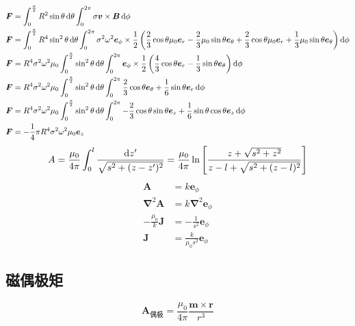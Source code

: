 \begin{align*}
    \boldsymbol{F}&=\int_{0}^{\frac{\pi}{2}}R^2\sin\theta\dif\theta\int_{0}^{2\pi}\sigma \boldsymbol{v}\times\boldsymbol{B}\dif\phi\\
    \boldsymbol{F}&=\int_{0}^{\frac{\pi}{2}}R^4\sin^2\theta\dif\theta\int_{0}^{2\pi}\sigma^2 \omega^2 \boldsymbol{e}_\phi\times\frac12\left(\frac{2}{3}
\cos\theta  \mu_0  \boldsymbol{e}_r
-\frac{2}{3 } \mu_0 \sin\theta 
\boldsymbol{e}_\theta
+\frac{2}{3}
\cos\theta  \mu_0 \boldsymbol{e}_r
+\frac{1}{3 } \mu_0 \sin\theta 
\boldsymbol{e}_\theta\right)\dif\phi\\
\boldsymbol{F}&=R^4\sigma^2 \omega^2\mu_0\int_{0}^{\frac{\pi}{2}}\sin^2\theta\dif\theta\int_{0}^{2\pi} \boldsymbol{e}_\phi\times\frac12\left(\frac{4}{3}
\cos\theta    \boldsymbol{e}_r
-\frac{1}{3 } \sin\theta 
\boldsymbol{e}_\theta\right)\dif\phi\\
\boldsymbol{F}&=R^4\sigma^2 \omega^2\mu_0\int_{0}^{\frac{\pi}{2}}\sin^2\theta\dif\theta\int_{0}^{2\pi} \frac{2}{3}
\cos\theta    \boldsymbol{e}_\theta
+\frac{1}{6} \sin\theta 
\boldsymbol{e}_r\dif\phi\\
\boldsymbol{F}&=R^4\sigma^2 \omega^2\mu_0\int_{0}^{\frac{\pi}{2}}\sin^2\theta\dif\theta\int_{0}^{2\pi} -\frac{2}{3}
\cos\theta    \sin\theta\boldsymbol{e}_z
+\frac{1}{6} \sin\theta \cos\theta
\boldsymbol{e}_z\dif\phi\\
\boldsymbol{F}&=-\frac{1}{4}\pi R^4\sigma^2 \omega^2\mu_0
\boldsymbol{e}_z
\end{align*}
\begin{align*}
    A=\frac{\mu_0}{4\pi}\int_0^l\frac{\dif z'}{\sqrt{s^2+(z-z')^2}}=\frac{\mu_0}{4\pi}\ln\left[\frac{z+\sqrt{s^2+z^2}}{z-l+\sqrt{s^2+(z-l)^2}}\right]\end{align*}
\begin{align*}
    \boldsymbol A&=k\boldsymbol{e}_\phi\\
    \boldsymbol\nabla^2\boldsymbol A&=k\boldsymbol\nabla^2\boldsymbol{e}_\phi\\
    -\frac{\mu_0}{k}\boldsymbol{J}
    &=-
\frac{1}{s^2}\boldsymbol{e}_\phi\\
\boldsymbol{J}
    &=
\frac{k}{\mu_0s^2}\boldsymbol{e}_\phi
\end{align*}
\subsection{磁偶极矩}
\begin{equation}
    \boldsymbol{A}_\text{偶极}=\frac{\mu_0}{4\pi}\frac{\boldsymbol{m}\times\boldsymbol{r}}{r^3}
\end{equation}

